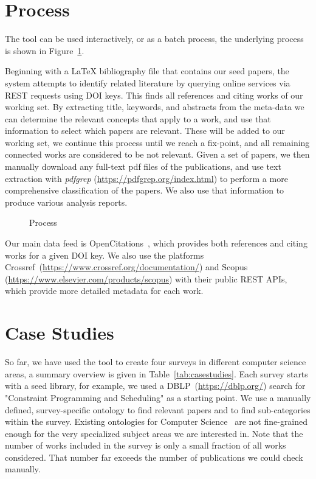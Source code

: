 \documentclass[
 hf]{ceurart}
\begin{document}
\section{Process}

The tool can be used interactively, or as a batch process, the underlying process is shown in Figure~\ref{fig:process}.

Beginning with a LaTeX bibliography file that contains our seed papers, the system attempts to identify related literature by querying online services via REST requests using DOI keys. This finds all references and citing works of our working set. By extracting title, keywords, and abstracts from the meta-data we can determine the relevant concepts that apply to a work, and use that information to select which papers are relevant. These will be added to our working set, we continue this process until we reach a fix-point, and all remaining connected works are considered to be not relevant. Given a set of papers, we then manually download any full-text pdf files of the publications, and use text extraction with \emph{pdfgrep} (\url{https://pdfgrep.org/index.html}) to perform a more comprehensive classification of the papers. We also use that information to produce various analysis reports. 

\begin{figure}[htbp]
\centering

\caption{\label{fig:process}Process}
\end{figure}

Our main data feed is OpenCitations~\cite{Peroni2020}, which provides both references and citing works for a given DOI key. We also use the platforms Crossref~(\url{https://www.crossref.org/documentation/}) and Scopus (\url{https://www.elsevier.com/products/scopus})
with their public REST APIs, which provide more detailed metadata for each work. 

\section{Case Studies}

So far, we have used the tool to create four surveys in different computer science areas, a summary overview is given in Table~\ref{tab:casestudies}. Each survey starts with a seed library, for example, we used a DBLP~(\url{https://dblp.org/}) search for "Constraint Programming and Scheduling" as a starting point. We use a manually defined, survey-specific ontology to find relevant papers and to find sub-categories within the survey. Existing ontologies for Computer Science~\cite{Beck2020} are not fine-grained enough for the very specialized subject areas we are interested in. Note that the number of works included in the survey is only a small fraction of all works considered. That number far exceeds the number of publications we could check manually.
\end{document}
